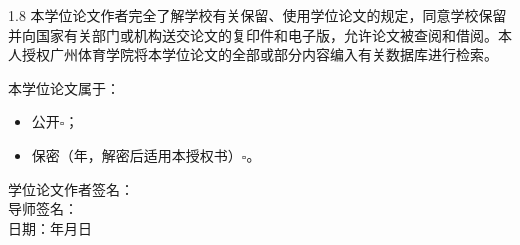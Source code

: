 \begin{spacing}{1.8}
\noindent
本学位论文作者完全了解学校有关保留、使用学位论文的规定，同意学校保留并向国家有关部门或机构送交论文的复印件和电子版，允许论文被查阅和借阅。本人授权广州体育学院将本学位论文的全部或部分内容编入有关数据库进行检索。

\vspace{0.8cm}

\noindent
本学位论文属于：
\begin{itemize}
\item 公开$\square$；
\item 保密（\hspace{2cm}年，解密后适用本授权书）$\square$。
\end{itemize}

\vspace{1.5cm}

\begin{flushright}
学位论文作者签名：\underline{\hspace{4cm}}\\[0.8cm]
导师签名：\underline{\hspace{4cm}}\\[0.8cm]
日期：\underline{\hspace{4cm}}年\underline{\hspace{2cm}}月\underline{\hspace{2cm}}日
\end{flushright}
\end{spacing}

\newpage
\pagestyle{plain}


\newpage

